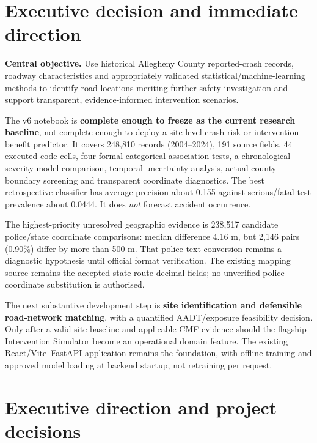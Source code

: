\documentclass[11pt,a4paper,openany]{report}
\begin{document}
\chapter*{Executive decision and immediate direction}
\textbf{Central objective.} Use historical Allegheny County reported-crash records, roadway characteristics and appropriately validated statistical/machine-learning methods to identify road locations meriting further safety investigation and support transparent, evidence-informed intervention scenarios.

The v6 notebook is \textbf{complete enough to freeze as the current research baseline}, not complete enough to deploy a site-level crash-risk or intervention-benefit predictor. It covers 248,810 records (2004--2024), 191 source fields, 44 executed code cells, four formal categorical association tests, a chronological severity model comparison, temporal uncertainty analysis, actual county-boundary screening and transparent coordinate diagnostics. The best retrospective classifier has average precision about 0.155 against serious/fatal test prevalence about 0.0444. It does \emph{not} forecast accident occurrence.

The highest-priority unresolved geographic evidence is 238,517 candidate police/state coordinate comparisons: median difference 4.16 m, but 2,146 pairs (0.90\%) differ by more than 500 m. That police-text conversion remains a diagnostic hypothesis until official format verification. The existing mapping source remains the accepted state-route decimal fields; no unverified police-coordinate substitution is authorised.

The next substantive development step is \textbf{site identification and defensible road-network matching}, with a quantified AADT/exposure feasibility decision. Only after a valid site baseline and applicable CMF evidence should the flagship Intervention Simulator become an operational domain feature. The existing React/Vite--FastAPI application remains the foundation, with offline training and approved model loading at backend startup, not retraining per request.

\tableofcontents
\clearpage
{}

\chapter{Executive direction and project decisions}
\end{document}
